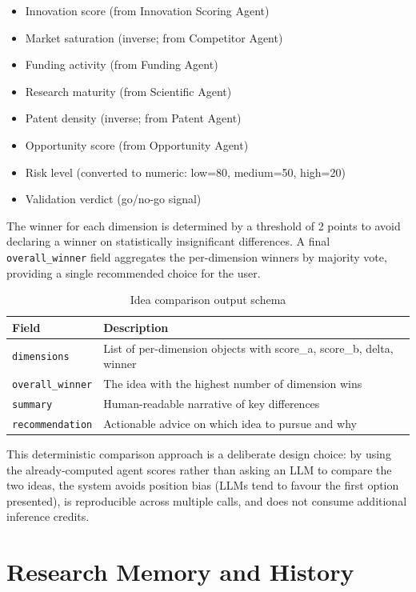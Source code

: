 \documentclass[12pt,a4paper,oneside]{book}
\begin{document}
\begin{itemize}
  \item Innovation score (from Innovation Scoring Agent)
  \item Market saturation (inverse; from Competitor Agent)
  \item Funding activity (from Funding Agent)
  \item Research maturity (from Scientific Agent)
  \item Patent density (inverse; from Patent Agent)
  \item Opportunity score (from Opportunity Agent)
  \item Risk level (converted to numeric: low=80, medium=50, high=20)
  \item Validation verdict (go/no-go signal)
\end{itemize}

The winner for each dimension is determined by a threshold of 2 points to avoid
declaring a winner on statistically insignificant differences. A final
\texttt{overall\_winner} field aggregates the per-dimension winners by majority
vote, providing a single recommended choice for the user.

\begin{table}[H]
\centering
\caption{Idea comparison output schema}
\label{tab:comparison_schema}
\begin{tabularx}{\textwidth}{lX}
\toprule
\textbf{Field} & \textbf{Description} \\
\midrule
\texttt{dimensions}      & List of per-dimension objects with score\_a, score\_b, delta, winner \\
\texttt{overall\_winner} & The idea with the highest number of dimension wins \\
\texttt{summary}         & Human-readable narrative of key differences \\
\texttt{recommendation}  & Actionable advice on which idea to pursue and why \\
\bottomrule
\end{tabularx}
\end{table}

This deterministic comparison approach is a deliberate design choice: by using the
already-computed agent scores rather than asking an LLM to compare the two ideas,
the system avoids position bias (LLMs tend to favour the first option presented),
is reproducible across multiple calls, and does not consume additional inference
credits.

\section{Research Memory and History}
\label{sec:memory}
\end{document}
